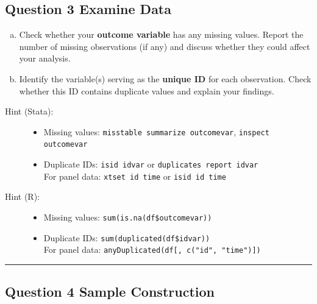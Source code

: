 \documentclass[paper=a4, fontsize=11pt]{scrartcl}
\newcommand{\horrule}[1]{\rule{\linewidth}{#1}}
\begin{document}
\subsection*{Question 3 \quad Examine Data}

\begin{enumerate}[(a)]
  \item Check whether your \textbf{outcome variable} has any missing values. Report the number of missing observations (if any) and discuss whether they could affect your analysis.
  \item Identify the variable(s) serving as the \textbf{unique ID} for each observation. Check whether this ID contains duplicate values and explain your findings.
\end{enumerate}

\begin{description}
  \item[Hint (Stata):]
    \begin{itemize}
      \item Missing values: \texttt{misstable summarize outcomevar}, \texttt{inspect outcomevar}
      \item Duplicate IDs: \texttt{isid idvar} or \texttt{duplicates report idvar} \\
            For panel data: \texttt{xtset id time} or \texttt{isid id time}
    \end{itemize}
  \item[Hint (R):]
    \begin{itemize}
      \item Missing values: \texttt{sum(is.na(df\$outcomevar))}
      \item Duplicate IDs: \texttt{sum(duplicated(df\$idvar))} \\
            For panel data: \texttt{anyDuplicated(df[, c("id", "time")])}
    \end{itemize}
\end{description}

\bigskip\horrule{0.4pt}\bigskip


\subsection*{Question 4 \quad Sample Construction}
\end{document}
